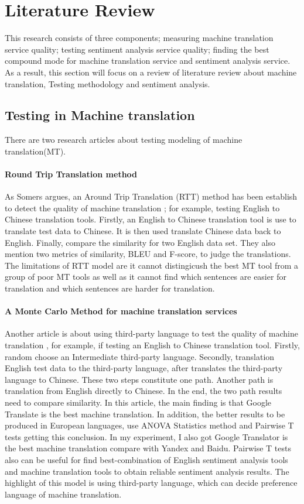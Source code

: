 \documentclass[conference]{IEEEtran}
\begin{document}
\section{Literature Review}
This research consists of three components; measuring machine translation
service quality; testing sentiment analysis service quality;
finding the best compound mode for machine translation service and
sentiment analysis service.
As a result, this section will focus on a review of literature review about machine
translation, Testing methodology and sentiment analysis.
\subsection{Testing in Machine translation}
There are two research articles about testing modeling of machine
translation(MT).

\paragraph{Round Trip Translation method}
As Somers argues, an Around Trip Translation (RTT) method has been establish to
detect the quality of machine translation \cite{roundTripTranslation}; for example, testing English to Chinese translation tools.
Firstly, an English to Chinese translation tool is use to translate test data to
Chinese. It is then used translate Chinese data back to English.
Finally, compare the similarity for two English data set.
They also mention two metrics of similarity, BLEU and F-score, to judge the
translations. The limitations of RTT model are it cannot distingicush the best
MT tool from a group of poor MT tools as well as it cannot find which sentences are easier for
translation and which sentences are harder for translation.

\paragraph{A Monte Carlo Method for machine translation services}
Another article is about using third-party language to test the quality of machine
translation \cite{thirdPartMachineTranslation}, for example, if testing an English to Chinese translation tool.
Firstly, random choose an Intermediate third-party language.
Secondly, translation English test data to the third-party language, after
translates the third-party language to Chinese.
These two steps constitute one path.
Another path is translation from English directly to Chinese.
In the end, the two path results need to compare similarity. In this article, the main
finding is that Google Translate is the best machine translation. In addition,
the better results to be produced in European languages, use ANOVA Statistics method and Pairwise T tests getting this conclusion.
In my experiment, I also got Google Translator is the best machine translation
compare with Yandex and Baidu. Pairwise T tests also can be useful for find best-combination of English
sentiment analysis tools and machine translation tools to obtain reliable
sentiment analysis results. The highlight of this model is using third-party
language, which can decide preference language of machine translation.
\end{document}
